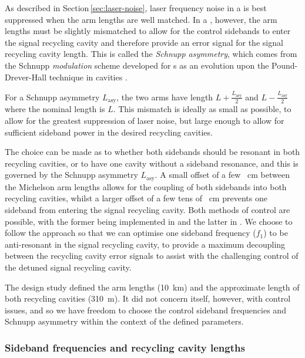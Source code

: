 As described in Section\,\ref{sec:laser-noise}, laser frequency noise in a \MI{} is best suppressed when the arm lengths are well matched. In a \DRFPMI{}, however, the arm lengths must be slightly mismatched to allow for the control sidebands to enter the signal recycling cavity and therefore provide an error signal for the signal recycling cavity length. This is called the \emph{Schnupp asymmetry}, which comes from the Schnupp \emph{modulation} scheme developed for \MI{}s as an evolution upon the Pound-Drever-Hall technique in \FP{} cavities .

For a Schnupp asymmetry $L_{\text{asy}}$, the two arms have length $L + \frac{L_{\text{asy}}}{2}$ and $L - \frac{L_{\text{asy}}}{2}$ where the nominal length is $L$. This mismatch is ideally as small as possible, to allow for the greatest suppression of laser noise, but large enough to allow for sufficient sideband power in the desired recycling cavities.

The choice can be made as to whether both sidebands should be resonant in both recycling cavities, or to have one cavity without a sideband resonance, and this is governed by the Schnupp asymmetry $L_{\text{asy}}$. A small offset of a few \SI{}{\centi\meter} between the Michelson arm lengths allows for the coupling of both sidebands into both recycling cavities, whilst a larger offset of a few tens of \SI{}{\centi\meter} prevents one sideband from entering the signal recycling cavity.  Both methods of control are possible, with the former being implemented in \KAGRA{} and the latter in \ALIGO{} . We choose to follow the \ALIGO{} approach so that we can optimise one sideband frequency ($f_1$) to be anti-resonant in the signal recycling cavity, to provide a maximum decoupling between the recycling cavity error signals to assist with the challenging control of the detuned signal recycling cavity.

The design study defined the arm lengths (\SI{10}{\kilo\meter}) and the approximate length of both recycling cavities (\SI{310}{\meter}). It did not concern itself, however, with control issues, and so we have freedom to choose the control sideband frequencies and Schnupp asymmetry within the context of the defined parameters.

\subsubsection{Sideband frequencies and recycling cavity lengths}

